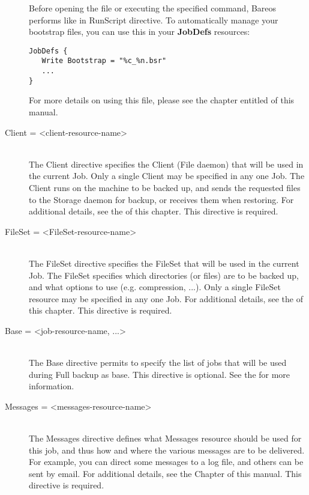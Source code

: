 \begin{description}
Before opening the file or executing the
specified command, Bareos performs
 like in RunScript
directive. To automatically manage your bootstrap files, you can use
this in your {\bf JobDefs} resources:
\begin{verbatim}
JobDefs {
   Write Bootstrap = "%c_%n.bsr"
   ...
}
\end{verbatim}

For more details on using this file, please see the chapter entitled
 of this manual.

\item [Client = {\textless}client-resource-name{\textgreater}] \hfill \\
The Client directive  specifies the Client (File daemon) that will be used in
the  current Job. Only a single Client may be specified in any one Job.  The
Client runs on the machine to be backed up,  and sends the requested files to
the Storage daemon for backup,  or receives them when restoring. For
additional details, see the
 of this chapter.
This directive is required.

\item [FileSet = {\textless}FileSet-resource-name{\textgreater}] \hfill \\
The FileSet directive specifies the FileSet that will be used in the
current Job.  The FileSet specifies which directories (or files) are to
be backed up, and what options to use (e.g.  compression, ...).  Only a
single FileSet resource may be specified in any one Job.  For additional
details, see the  of
this chapter.  This directive is required.

\item [Base = {\textless}job-resource-name, ...{\textgreater}] \hfill \\
The Base directive permits to specify the list of jobs that will be used during
Full backup as base. This directive is optional. See the  for more information.

\item [Messages = {\textless}messages-resource-name{\textgreater}] \hfill \\
The Messages directive defines what Messages resource should be used for
this job, and thus how and where the various messages are to be
delivered.  For example, you can direct some messages to a log file, and
others can be sent by email.  For additional details, see the
 Chapter of this manual.  This
directive is required.


\end{description}
